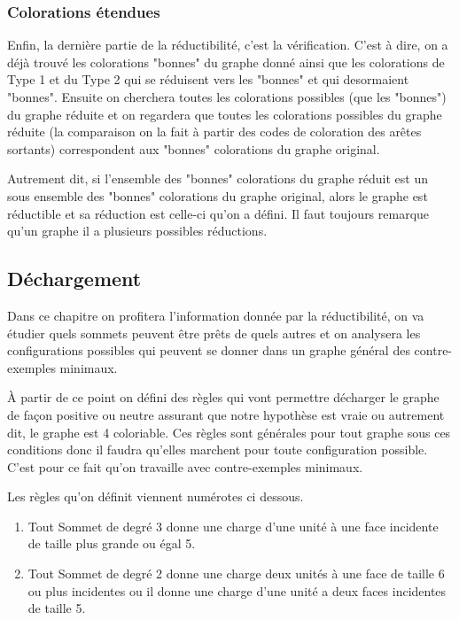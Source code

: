 \documentclass[10pt,a4paper]{article}
\begin{document}
\subsubsection{Colorations étendues}

Enfin, la dernière partie de la réductibilité, c'est la vérification. C'est à dire, on a déjà trouvé les colorations "bonnes" du graphe donné ainsi que les colorations de Type 1 et du Type 2 qui se réduisent vers les "bonnes" et qui desormaient "bonnes". Ensuite on cherchera toutes les colorations possibles (que les "bonnes") du graphe réduite et on regardera que toutes les colorations possibles du graphe réduite (la comparaison on la fait à partir des codes de coloration des arêtes sortants) correspondent aux "bonnes" colorations du graphe original. 

Autrement dit, si l'ensemble des "bonnes" colorations du graphe réduit est un sous ensemble des "bonnes" colorations du graphe original, alors le graphe est réductible et sa réduction est celle-ci qu'on a défini. Il faut toujours remarque qu'un graphe il a plusieurs possibles réductions. 

\subsection{Déchargement}

Dans ce chapitre on profitera l'information donnée par la réductibilité, on va étudier quels sommets peuvent être prêts de quels autres et on analysera les configurations possibles qui peuvent se donner dans un graphe général des contre-exemples minimaux. 

À partir de ce point on défini des règles qui vont permettre décharger le graphe de façon positive ou neutre assurant que notre hypothèse est vraie ou autrement dit, le graphe est 4 coloriable. Ces règles sont générales pour tout graphe sous ces conditions donc il faudra qu'elles marchent pour toute configuration possible. C'est pour ce fait qu'on travaille avec contre-exemples minimaux. 

Les règles qu'on définit viennent numérotes ci dessous.

\begin{enumerate}
\item Tout Sommet de degré 3 donne une charge d'une unité à une face incidente de taille plus grande ou égal 5.
\item Tout Sommet de degré 2 donne une charge deux unités à une face de taille 6 ou plus incidentes ou il donne une charge d'une unité a deux faces incidentes de taille 5.
\end{enumerate} 
\end{document}

